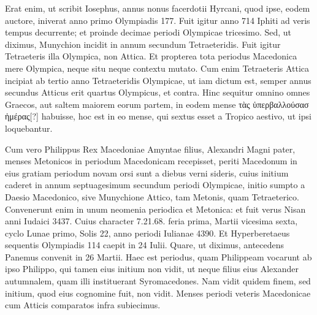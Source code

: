 Erat enim,
ut scribit Iosephus, annus nonus facerdotii Hyrcani, quod ipse, eodem
auctore, iniverat anno primo Olympiadis 177.
Fuit igitur anno 714
Iphiti ad veris tempus decurrente; et proinde decimae periodi Olympicae
tricesimo.
Sed, ut diximus, Munychion incidit in annum
secundum Tetraeteridis.
Fuit igitur Tetraeteris illa Olympica,
non Attica.
Et propterea tota periodus Macedonica mere Olympica,
neque situ neque contextu mutato.
%
Cum enim Tetraeteris Attica
incipiat ab tertio anno Tetraeteridis Olympicae, ut iam dictum est, semper
annus secundus Atticus erit quartus Olympicus, et contra.
Hinc
sequitur omnino omnes Graecos, aut saltem maiorem eorum partem,
in eodem mense \textgreek{τὰς ὑπερβαλλούσασ ἡμέρας[?]}
 habuisse, hoc est in eo
mense, qui sextus esset a Tropico aestivo, ut ipsi loquebantur.
\begin{table}[hbtp]
  
\end{table}
Cum
vero Philippus Rex Macedoniae Amyntae filius, Alexandri Magni
pater, menses Metonicos in periodum Macedonicam recepisset,
periti Macedonum in eius gratiam periodum novam orsi sunt a diebus
verni sideris, cuius initium caderet in annum septuagesimum
secundum periodi Olympicae, initio sumpto a Daesio Macedonico,
sive Munychione Attico, tam Metonis, quam Tetraeterico.
Convenerunt enim in unum neomenia periodica et
Metonica: et fuit verus Nisan anni Iudaici
3437.
Cuius character 7.21.68. feria prima,
Martii vicesima sexta, cyclo Lunae primo,
Solis 22, anno periodi Iulianae 4390.
Et
Hyperberetaeus sequentis Olympiadis 114
caepit in 24 Iulii.
Quare, ut diximus, antecedens
Panemus convenit in 26 Martii.
Haec
est periodus, quam Philippeam vocarunt ab
ipso Philippo, qui tamen eius initium non
vidit, ut neque filius eius Alexander autumnalem,
quam illi instituerant Syromacedones.
Nam vidit quidem finem, sed initium, quod eius cognomine fuit, non
vidit.
Menses periodi veteris Macedonicae cum Atticis comparatos
infra subiecimus.
